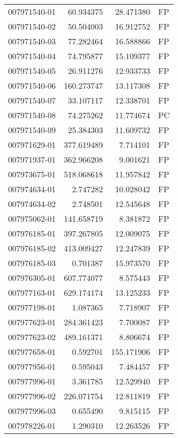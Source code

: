 \begin{tabular}{lrrl}
007971540-01 &   60.934375 &    28.471380 &   FP \\
007971540-02 &   50.504003 &    16.912752 &   FP \\
007971540-03 &   77.282464 &    16.588866 &   FP \\
007971540-04 &   74.795877 &    15.109377 &   FP \\
007971540-05 &   26.911276 &    12.933733 &   FP \\
007971540-06 &  160.273747 &    13.117308 &   FP \\
007971540-07 &   33.107117 &    12.338701 &   FP \\
007971540-08 &   74.275262 &    11.774674 &   PC \\
007971540-09 &   25.384303 &    11.609732 &   FP \\
007971629-01 &  377.619489 &     7.714101 &   FP \\
007971937-01 &  362.966208 &     9.001621 &   FP \\
007973675-01 &  518.068618 &    11.957842 &   FP \\
007974634-01 &    2.747282 &    10.028042 &   FP \\
007974634-02 &    2.748501 &    12.545648 &   FP \\
007975062-01 &  141.658719 &     8.381872 &   FP \\
007976185-01 &  397.267805 &    12.009075 &   FP \\
007976185-02 &  413.009427 &    12.247839 &   FP \\
007976185-03 &    0.701387 &    15.973570 &   FP \\
007976305-01 &  607.774077 &     8.575443 &   FP \\
007977163-01 &  629.174174 &    13.125233 &   FP \\
007977198-01 &    1.087365 &     7.718907 &   FP \\
007977623-01 &  284.361423 &     7.700087 &   FP \\
007977623-02 &  489.161371 &     8.806674 &   FP \\
007977658-01 &    0.592701 &   155.171906 &   FP \\
007977956-01 &    0.595043 &     7.484457 &   FP \\
007977996-01 &    3.361785 &    12.529940 &   FP \\
007977996-02 &  226.071754 &    12.811819 &   FP \\
007977996-03 &    0.655490 &     9.815115 &   FP \\
007978226-01 &    1.290310 &    12.263526 &   FP \\

\end{tabular}
